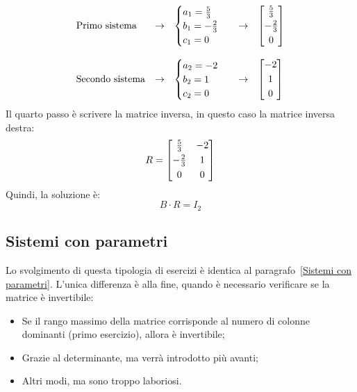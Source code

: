 \documentclass[a4paper]{article}
\makeatletter
\newenvironment{rowequmatbra}[1]{\left[\array{@{}#1@{}}}{\endarray\right]}
\makeatother
\begin{document}
	\begin{equation*}
		\begin{array}{lllll}
			\text{Primo sistema}	& \rightarrow & \begin{cases}
				a_{1} = \frac{5}{3}  \\
				b_{1} = -\frac{2}{3} \\
				c_{1} = 0
			\end{cases} & \rightarrow & \begin{rowequmatbra}{c}
				\frac{5}{3}  \\ [0.3em]
				-\frac{2}{3} \\ [0.3em]
				0
			\end{rowequmatbra} \\
			\\
			\text{Secondo sistema}	& \rightarrow & \begin{cases}
				a_{2} = -2 \\
				b_{2} =  1  \\
				c_{2} =  0
			\end{cases} & \rightarrow & \begin{rowequmatbra}{c}
				-2 \\ [0.3em]
				 1 \\ [0.3em]
				 0
			\end{rowequmatbra}
		\end{array}
	\end{equation*}
	Il \textcolor{Red3}{quarto passo} è scrivere la matrice inversa, in questo caso la matrice inversa destra:
	\begin{equation*}
		R = \begin{rowequmatbra}{cc}
			\frac{5}{3}	 & -2 \\ [0.3em]
			-\frac{2}{3} &  1 \\ [0.3em]
			0			 &  0
		\end{rowequmatbra}
	\end{equation*}
	Quindi, la soluzione è:
	\begin{equation*}
		B \cdot R = I_{2}
	\end{equation*}\newpage

	\subsection{Sistemi con parametri}
	
	Lo svolgimento di questa tipologia di esercizi è identica al paragrafo~\ref{Sistemi con parametri}. L'unica differenza è alla fine, quando è necessario verificare se la matrice è invertibile:
	\begin{itemize}
		\item Se il rango massimo della matrice corrisponde al numero di colonne dominanti (primo esercizio), allora è invertibile;
		\item Grazie al determinante, ma verrà introdotto più avanti;	
		\item Altri modi, ma sono troppo laboriosi.
	\end{itemize}	
\end{document}
